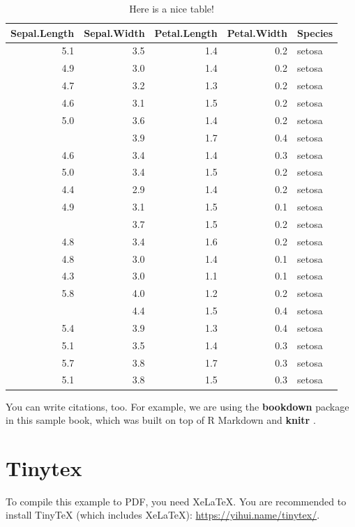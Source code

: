 \documentclass[
  fontsize=13pt,
  english,
  a4paper,
  openany, a4paper, oneside]{book}
\begin{document}
\begin{table}

\caption{\label{tab:nicetab}Here is a nice table!}
\centering
\begin{tabular}[t]{rrrrl}
\toprule
Sepal.Length & Sepal.Width & Petal.Length & Petal.Width & Species\\
\midrule
5.1 & 3.5 & 1.4 & 0.2 & setosa\\
4.9 & 3.0 & 1.4 & 0.2 & setosa\\
4.7 & 3.2 & 1.3 & 0.2 & setosa\\
4.6 & 3.1 & 1.5 & 0.2 & setosa\\
5.0 & 3.6 & 1.4 & 0.2 & setosa\\
\addlinespace
5.4 & 3.9 & 1.7 & 0.4 & setosa\\
4.6 & 3.4 & 1.4 & 0.3 & setosa\\
5.0 & 3.4 & 1.5 & 0.2 & setosa\\
4.4 & 2.9 & 1.4 & 0.2 & setosa\\
4.9 & 3.1 & 1.5 & 0.1 & setosa\\
\addlinespace
5.4 & 3.7 & 1.5 & 0.2 & setosa\\
4.8 & 3.4 & 1.6 & 0.2 & setosa\\
4.8 & 3.0 & 1.4 & 0.1 & setosa\\
4.3 & 3.0 & 1.1 & 0.1 & setosa\\
5.8 & 4.0 & 1.2 & 0.2 & setosa\\
\addlinespace
5.7 & 4.4 & 1.5 & 0.4 & setosa\\
5.4 & 3.9 & 1.3 & 0.4 & setosa\\
5.1 & 3.5 & 1.4 & 0.3 & setosa\\
5.7 & 3.8 & 1.7 & 0.3 & setosa\\
5.1 & 3.8 & 1.5 & 0.3 & setosa\\
\bottomrule
\end{tabular}
\end{table}

You can write citations, too. For example, we are using the \textbf{bookdown} package \citep{R-bookdown} in this sample book, which was built on top of R Markdown and \textbf{knitr} \citep{xie2015}.

\hypertarget{tinytex}{%
\section{Tinytex}\label{tinytex}}

To compile this example to PDF, you need XeLaTeX. You are recommended to install TinyTeX (which includes XeLaTeX): \url{https://yihui.name/tinytex/}.

  
\end{document}
